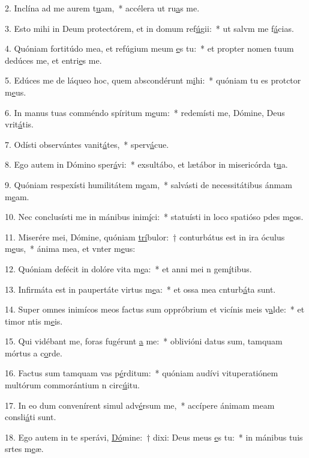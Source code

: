 2. Inclína ad me aurem t\uline{u}am,~* accélera ut ru\uline{a}s me.\par 
3. Esto mihi in Deum protectórem, et in domum ref\uline{ú}gii:~* ut salvm me f\uline{á}cias.\par 
4. Quóniam fortitúdo mea, et refúgium meum \uline{e}s tu:~* et propter nomen tuum dedúces me, et entri\uline{e}s me.\par 
5. Edúces me de láqueo hoc, quem abscondérunt m\uline{i}hi:~* quóniam tu es protctor m\uline{e}us.\par 
6. In manus tuas comméndo spíritum m\uline{e}um:~* redemísti me, Dómine, Deus vrit\uline{á}tis.\par 
7. Odísti observántes vanit\uline{á}tes,~* sperv\uline{á}cue.\par 
8. Ego autem in Dómino sper\uline{á}vi:~* exsultábo, et lætábor in misericórda t\uline{u}a.\par 
9. Quóniam respexísti humilitátem m\uline{e}am,~* salvásti de necessitátibus ánmam m\uline{e}am.\par 
10. Nec conclusísti me in mánibus inim\uline{í}ci:~* statuísti in loco spatióso pdes m\uline{e}os.\par 
11. Miserére mei, Dómine, quóniam \uline{trí}bulor:~† conturbátus est in ira óculus m\uline{e}us,~* ánima mea, et vnter m\uline{e}us:\par 
12. Quóniam defécit in dolóre vita m\uline{e}a:~* et anni mei n gem\uline{í}tibus.\par 
13. Infirmáta est in paupertáte virtus m\uline{e}a:~* et ossa mea cnturb\uline{á}ta sunt.\par 
14. Super omnes inimícos meos factus sum oppróbrium et vicínis meis v\uline{a}lde:~* et timor ntis m\uline{e}is.\par 
15. Qui vidébant me, foras fugérunt \uline{a} me:~* oblivióni datus sum, tamquam mórtus a c\uline{o}rde.\par 
16. Factus sum tamquam vas p\uline{é}rditum:~* quóniam audívi vituperatiónem multórum commorántium n circ\uline{ú}itu.\par 
17. In eo dum convenírent simul adv\uline{é}rsum me,~* accípere ánimam meam consli\uline{á}ti sunt.\par 
18. Ego autem in te sperávi, \uline{Dó}mine:~† dixi: Deus meus \uline{e}s tu:~* in mánibus tuis srtes m\uline{e}æ.\par 
